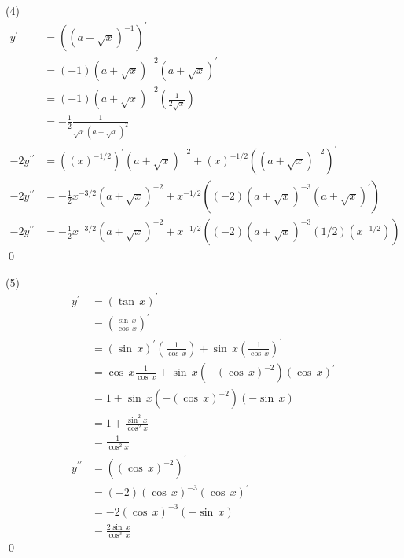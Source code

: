 (4) \solve
\begin{align}
    y^{\prime} &= \left(\left(a+\sqrt{x}\right)^{-1}\right)^{\prime} \\
    &= \left(-1\right)\left(a+\sqrt{x}\right)^{-2}\left(a+\sqrt{x}\right)^{\prime} \\
    &= \left(-1\right)\left(a+\sqrt{x}\right)^{-2}\left(\frac{1}{2\sqrt{x}}\right) \\
    &= -\frac{1}{2}\frac{1}{\sqrt{x}\left(a+\sqrt{x}\right)^2} \\
    -2y^{\prime\prime} &= \left(\left(x\right)^{-1/2}\right)^{\prime}\left(a+\sqrt{x}\right)^{-2}+\left(x\right)^{-1/2}\left(\left(a+\sqrt{x}\right)^{-2}\right)^{\prime} \\
    -2y^{\prime\prime} &= -\frac{1}{2}x^{-3/2}\left(a+\sqrt{x}\right)^{-2} + x^{-1/2}\left(\left(-2\right)\left(a+\sqrt{x}\right)^{-3}\left(a+\sqrt{x}\right)^{\prime}\right) \\
    -2y^{\prime\prime} &= -\frac{1}{2}x^{-3/2}\left(a+\sqrt{x}\right)^{-2} + x^{-1/2}\left(\left(-2\right)\left(a+\sqrt{x}\right)^{-3}\left(1/2\right)\left(x^{-1/2}\right)\right)
\end{align}
\qed\bigskip

(5) \solve
\begin{align}
    y^{\prime} &= \left(\tan \, x\right)^{\prime} \\
    &= \left(\frac{\sin \, x}{\cos \, x}\right)^{\prime} \\
    &= \left(\sin \, x\right)^{\prime}\left(\frac{1}{\cos \, x}\right) + \sin \, x \left(\frac{1}{\cos \, x}\right)^{\prime} \\
    &= \cos \, x \frac{1}{\cos \, x} + \sin \, x \left(-\left(\cos \, x\right)^{-2}\right)\left(\cos \, x\right)^{\prime} \\
    &=1+\sin \, x \left(-\left(\cos \, x\right)^{-2}\right)\left(-\sin \, x\right) \\
    &=1+\frac{\sin^2 x}{\cos^2 x} \\
    &=\frac{1}{\cos^2 x} \\
    y^{\prime\prime} &= \left(\left(\cos \, x\right)^{-2}\right)^{\prime} \\
    &= \left(-2\right)\left(\cos \, x\right)^{-3}\left(\cos \, x\right)^{\prime} \\
    &= -2 \left(\cos \, x\right)^{-3}\left(-\sin \, x\right) \\
    &= \frac{2\sin \, x}{\cos^3 \, x}
\end{align}
\qed\bigskip

